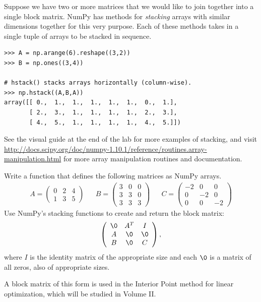 Suppose we have two or more matrices that we would like to join together into a single block matrix.
NumPy has methods for \emph{stacking} arrays with similar dimensions together for this very purpose.
Each of these methods takes in a single tuple of arrays to be stacked in sequence.

\begin{lstlisting}
>>> A = np.arange(6).reshape((3,2))
>>> B = np.ones((3,4))

# hstack() stacks arrays horizontally (column-wise).
>>> np.hstack((A,B,A))
array([[ 0.,  1.,  1.,  1.,  1.,  1.,  0.,  1.],
       [ 2.,  3.,  1.,  1.,  1.,  1.,  2.,  3.],
       [ 4.,  5.,  1.,  1.,  1.,  1.,  4.,  5.]])
\end{lstlisting}

See the visual guide at the end of the lab for more examples of stacking, and 
visit \url{http://docs.scipy.org/doc/numpy-1.10.1/reference/routines.array-manipulation.html} for more array manipulation routines and documentation.

\begin{problem} %
Write a function that defines the following matrices as NumPy arrays.
\begin{align*}
A = \left(\begin{array}{rrr}
0 & 2 & 4\\ 
1 & 3 & 5\end{array}\right)
&&
B = \left(\begin{array}{rrr}
3 & 0 & 0\\ 
3 & 3 & 0\\
3 & 3 & 3\end{array}\right)
&&
C = \left(\begin{array}{rrr}
-2 & 0 & 0\\ 
0 & -2 & 0\\
0 & 0 & -2\end{array}\right)
\end{align*}
Use NumPy's stacking functions to create and return the block matrix:
\begin{align*}
\left(\begin{array}{ccc}
\0 & A^T & I\\ 
A & \0 & \0 \\
B & \0 & C \end{array}\right),
\end{align*}
where $I$ is the identity matrix of the appropriate size and each $\0$ is a matrix of all zeros, also of appropriate sizes.

A block matrix of this form is used in the Interior Point method for linear optimization, which will be studied in Volume II.
\label{prob:simple3}
\end{problem}

